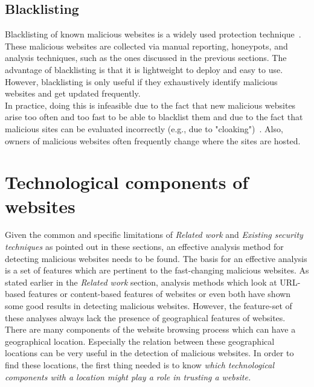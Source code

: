 \documentclass[twoside,openright,notitlepage]{uva-bachelor-thesis}
\begin{document}
\subsection{Blacklisting}
Blacklisting of known malicious websites is a widely used protection technique~\cite{malwareblacklist,phishtank,wot}. These malicious websites are collected via manual reporting, honeypots, and analysis techniques, such as the ones discussed in the previous sections. The advantage of blacklisting is that it is lightweight to deploy and easy to use. However, blacklisting is only useful if they exhaustively identify malicious websites and get updated frequently. \\

In practice, doing this is infeasible due to the fact that new malicious websites arise too often and too fast to be able to blacklist them and due to the fact that malicious sites can be evaluated incorrectly (e.g., due to "cloaking")~\cite{ma2009beyond}. Also, owners of malicious websites often frequently change where the sites are hosted.  

\section{Technological components of websites}
Given the common and specific limitations of \emph{Related work} and \emph{Existing security techniques} as pointed out in these sections, an effective analysis method for detecting malicious websites needs to be found. The basis for an effective analysis is a set of features which are pertinent to the fast-changing malicious websites. As stated earlier in the \emph{Related work} section, analysis methods which look at URL-based features or content-based features of websites or even both have shown some good results in detecting malicious websites. However, the feature-set of these analyses always lack the presence of geographical features of websites. There are many components of the website browsing process which can have a geographical location. Especially the relation between these geographical locations can be very useful in the detection of malicious websites. In order to find these locations, the first thing needed is to know \emph{which technological components with a location might play a role in trusting a website.}
\end{document}
